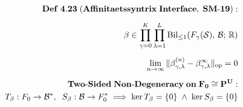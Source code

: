 \documentclass[preview]{standalone}
\begin{document}
\begin{align*}
\special{dvisvgm:raw <g id='unique000'>}\mathbf{Def\;4.23\;(Affinitaetssyntrix\;Interface,\;SM\text{-}19):}\\[5pt]\beta \in \prod_{\gamma=0}^K \prod_{\lambda=1}^L \operatorname{Bil}_{\le 1}\!\left(F_\gamma(\mathcal{S}),\, \mathcal{B};\, \mathbb{R}\right)\\[5pt]\lim_{n\to\infty} \|\beta_{\gamma,\lambda}^{(n)} - \beta_{\gamma,\lambda}^\infty\|_{\text{op}} = 0\\[5pt]\mathbf{Two\text{-}Sided\;Non\text{-}Degeneracy\;on\;F_0\cong P^U:}\\T_\beta: F_0 \to \mathcal{B}^*,\;\; S_\beta: \mathcal{B} \to F_0^* \implies \ker T_\beta = \{0\} \;\wedge\; \ker S_\beta = \{0\}\special{dvisvgm:raw </g>}
\end{align*}
\end{document}
